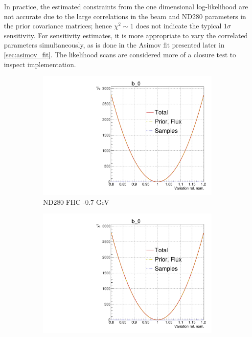 In practice, the estimated constraints from the one dimensional log-likelihood are not accurate due to the large correlations in the beam and ND280 parameters in the prior covariance matrices; hence $\chi^2\sim1$ does not indicate the typical $1\sigma$ sensitivity. For sensitivity estimates, it is more appropriate to vary the correlated parameters simultaneously, as is done in the Asimov fit presented later in \autoref{sec:asimov_fit}. The likelihood scans are considered more of a closure test to inspect implementation.
\begin{figure}[h]
	\centering
\begin{subfigure}[t]{0.32\textwidth}
	\includegraphics[width=\textwidth, trim={0mm 0mm 0mm 11mm}, clip,page=5]{figures/mach3/Asimov/Full_LLHscan_18July_BeRPA_U_ND280logL_scan}
	\caption{ND280 FHC -0.7 GeV}
\end{subfigure}
\begin{subfigure}[t]{0.32\textwidth}
\includegraphics[width=\textwidth, trim={0mm 0mm 0mm 11mm}, clip,page=13]{figures/mach3/Asimov/Full_LLHscan_18July_BeRPA_U_ND280logL_scan}

\end{subfigure}
\end{figure}

